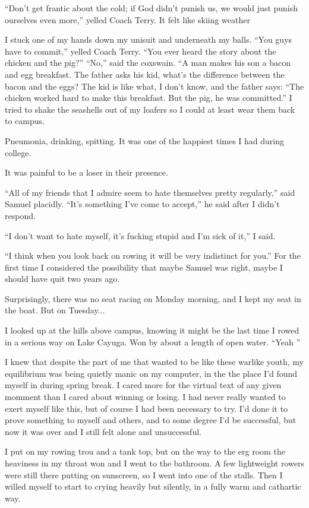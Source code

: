 ``Don't get frantic about the cold; if God didn't punish us, we would just
punish ourselves even more,'' yelled Coach Terry.  It felt like skiing weather

I stuck one of my hands down my unisuit and underneath my balls.  ``You guys
have to commit,'' yelled Coach Terry.  ``You ever heard the story about the
chicken and the pig?'' ``No,'' said the coxswain.  ``A man makes his son a bacon
and egg breakfast.  The father asks his kid, what's the difference between the
bacon and the eggs?  The kid is like what, I don't know, and the father says:
``The chicken worked hard to make this breakfast.  But the pig, he was
committed.'' I tried to shake the seashells out of my loafers so I could at
least wear them back to campus. 

Pneumonia, drinking, spitting.  It was one of the happiest times I had during college.

It was painful to be a loser in their presence.  

``All of my friends that I admire seem to hate themselves pretty regularly,''
said Samuel placidly.  ``It's something I've come to accept,'' he said after I
didn't respond.

``I don't want to hate myself, it's fucking stupid and I'm sick of it,'' I said.  

``I think when you look back on rowing it will be very indistinct for you.'' For
the first time I considered the possibility that maybe Samuel was right, maybe I
should have quit two years ago.

Surprisingly, there was no seat racing on Monday morning, and I kept my seat in
the boat.  But on Tuesday...


I looked up at the hills above campus, knowing it might be the last time I rowed
in a serious way on Lake Cayuga.  Won by about a length of open water.  ``Yeah
'' 

I knew that despite the part of me that wanted to be like these warlike youth,
my equilibrium was being quietly manic on my computer, in the the place I'd
found myself in during spring break.  I cared more for the virtual text of any
given momment than I cared about winning or losing.  I had never really wanted
to exert myself like this, but of course I had been necessary to try.  I'd done
it to prove something to myself and others, and to some degree I'd be
successful, but now it was over and I still felt alone and unsuccessful.

I put on my rowing trou and a tank top, but on the way to the erg room the
heaviness in my throat won and I went to the bathroom.  A few lightweight
rowers were still there putting on sunscreen, so I went into one of the stalls.
Then I willed myself to start to crying heavily but silently, in a fully warm
and cathartic way.  

